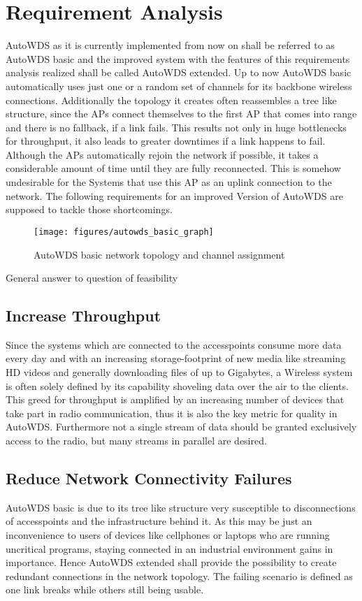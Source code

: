 \chapter{Requirement Analysis}
  AutoWDS as it is currently implemented from now on shall be referred to as 
  AutoWDS basic and the improved system with the features of this requirements analysis realized shall be called AutoWDS extended.
  Up to now AutoWDS basic automatically uses just one or a random set of channels for its backbone wireless connections. 
  Additionally the topology it creates often reassembles a tree like structure, since the APs connect themselves 
  to the first AP that comes into range and there is no fallback, if a link fails. This results not only in huge bottlenecks for throughput,
  it also leads to greater downtimes if a link happens to fail. Although the APs automatically rejoin the network if possible, it takes
  a considerable amount of time until they are fully reconnected. This is somehow undesirable for the Systems that use this AP as an uplink connection to
  the network. The following requirements for an improved Version of AutoWDS are supposed to tackle those shortcomings.
  \begin{figure}[t]
    \centering
    \texttt{[image: figures/autowds\_basic\_graph]}
    \caption{AutoWDS basic network topology and channel assignment}
    \label{fig:autowds_basic_graph}
  \end{figure}
General answer to question of feasibility
  \section{Increase Throughput}
  Since the systems which are connected to the accesspoints consume more data every day and with an increasing storage-footprint of new media like streaming HD videos
  and generally downloading files of up to Gigabytes, a Wireless system is often solely defined by its capability shoveling data over the air to the clients.
  This greed for throughput is amplified by an increasing number of devices that take part in radio communication, 
  thus it is also the key metric for quality in AutoWDS. Furthermore not a single stream of data should be granted exclusively access to the radio, but
  many streams in parallel are desired.
  \section{Reduce Network Connectivity Failures}
  AutoWDS basic is due to its tree like structure very susceptible to disconnections of accesspoints and the infrastructure behind it.
  As this may be just an inconvenience to users of devices like cellphones or laptops who are running uncritical programs, 
  staying connected in an industrial environment gains in importance. Hence AutoWDS extended shall provide the possibility to create 
  redundant connections in the network topology. The failing scenario is defined as one link breaks while others still being usable.

